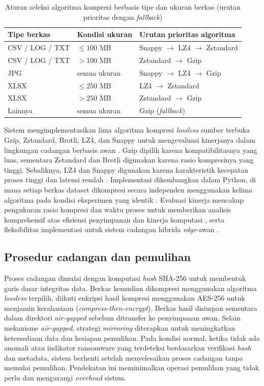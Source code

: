 \documentclass{iaesarticle}
\begin{document}
\begin{table}[H]
\centering
\fontsize{8pt}{10pt}\selectfont
\caption{Aturan seleksi algoritma kompresi berbasis tipe dan ukuran berkas (urutan prioritas dengan \textit{fallback})}
\label{tab:rule_selection}
\begin{tabular}{l l l}
\hline
\textbf{Tipe berkas} & \textbf{Kondisi ukuran} & \textbf{Urutan prioritas algoritma} \\
\hline
CSV / LOG / TXT & $\leq 100$ MB & Snappy $\rightarrow$ LZ4 $\rightarrow$ Zstandard \\
CSV / LOG / TXT & $> 100$ MB & Zstandard $\rightarrow$ Gzip \\
JPG & semua ukuran & Snappy $\rightarrow$ LZ4 $\rightarrow$ Gzip \\
XLSX & $\leq 250$ MB & LZ4 $\rightarrow$ Zstandard \\
XLSX & $> 250$ MB & Zstandard $\rightarrow$ Gzip \\
Lainnya & semua ukuran & Gzip (\textit{fallback}) \\
\hline
\end{tabular}
\end{table}

Sistem mengimplementasikan lima algoritma kompresi \textit{lossless} sumber terbuka Gzip, Zstandard, Brotli, LZ4, dan Snappy untuk mengevaluasi kinerjanya dalam lingkungan cadangan berbasis awan \cite{36}. Gzip dipilih karena kompatibilitasnya yang luas, sementara Zstandard dan Brotli digunakan karena rasio kompresinya yang tinggi. Sebaliknya, LZ4 dan Snappy digunakan karena karakteristik kecepatan proses tinggi dan latensi rendah \cite{37}. Implementasi dikembangkan dalam Python, di mana setiap berkas dataset dikompresi secara independen menggunakan kelima algoritma pada kondisi eksperimen yang identik \cite{38}. Evaluasi kinerja mencakup pengukuran rasio kompresi dan waktu proses untuk memberikan analisis komprehensif atas efisiensi penyimpanan dan kinerja komputasi \cite{39}, serta fleksibilitas implementasi untuk sistem cadangan hibrida \textit{edge}-awan \cite{22}.

\subsection{Prosedur cadangan dan pemulihan}
Proses cadangan dimulai dengan komputasi \textit{hash} SHA-256 untuk membentuk garis dasar integritas data. Berkas kemudian dikompresi menggunakan algoritma \textit{lossless} terpilih, diikuti enkripsi hasil kompresi menggunakan AES-256 untuk menjamin kerahasiaan (\textit{compress-then-encrypt}). Berkas hasil disimpan sementara dalam direktori \textit{air-gapped} sebelum ditransfer ke penyimpanan awan. Selain mekanisme \textit{air-gapped}, strategi \textit{mirroring} diterapkan untuk meningkatkan ketersediaan data dan kesiapan pemulihan. Pada kondisi normal, ketika tidak ada anomali atau indikator ransomware yang terdeteksi berdasarkan verifikasi \textit{hash} dan metadata, sistem berhenti setelah menyelesaikan proses cadangan tanpa memulai pemulihan. Pendekatan ini meminimalkan operasi pemulihan yang tidak perlu dan mengurangi \textit{overhead} sistem.
\end{document}

